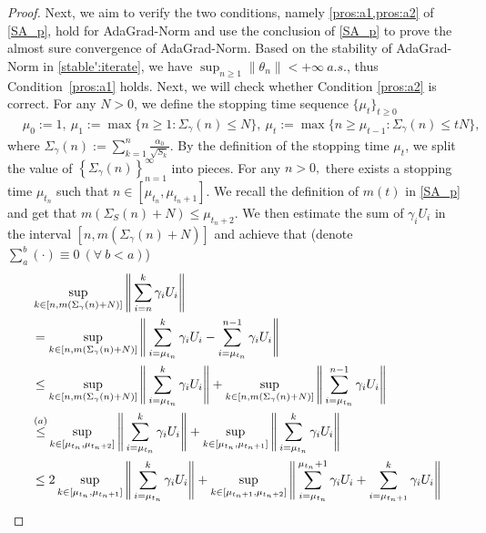 \documentclass[standalone]{article}
\begin{document}
\begin{proof}
Next, we aim to verify the two conditions, namely \cref{pros:a1,pros:a2} of \cref{SA_p}, hold for AdaGrad-Norm and use the conclusion of \cref{SA_p} to prove the almost sure convergence of AdaGrad-Norm.  Based on the stability of AdaGrad-Norm in \cref{stable':iterate}, we have \(\sup_{n\ge 1}\|\theta_{n}\|<+\infty\ a.s.\), thus Condition~\cref{pros:a1} holds. Next, we will check whether Condition \cref{pros:a2} is correct. For any \(N>0\), we define the stopping time sequence \(\{\mu_{t}\}_{t\ge 0}\)
\begin{equation}\nonumber\begin{aligned}
&\mu_{0}:=1,\ \mu_{1}:=\max\{n\ge 1:\Sigma_{\gamma}(n)\le N\},\ \mu_{t}:=\max\{n\ge \mu_{t-1}:\Sigma_{\gamma}(n)\le tN\},
\end{aligned}\end{equation}
where $ \Sigma_{\gamma}(n):=\sum_{k=1}^{n}\frac{\alpha_{0}}{\sqrt{S_{k}}}.$ By the definition of the stopping time $\mu_{t}$, we split the value of $\left\lbrace\Sigma_{\gamma}(n) \right\rbrace_{n=1}^{\infty}$ into pieces. 
For any $n>0,$ there exists a stopping time $\mu_{t_{n}}$ such that  $n\in[\mu_{t_{n}},\mu_{t_{n}+1}].$ We recall the definition of $m(t)$ in \cref{SA_p} and get that $m(\Sigma_{S}(n) + N) \leq \mu_{t_n+2}$. We then estimate the sum of $\gamma_{i}U_{i}$ in the interval $[n,m(\Sigma_{\gamma}(n)+N)]$ and achieve that (denote $\sum_{a}^{b}(\cdot)\equiv0\ (\forall\  b  < a)$)
\begin{align}\label{wxm_19}
 &\sup_{k\in[n,m(\Sigma_{\gamma}(n)+N)]}\Bigg\|\sum_{i=n}^{k}\gamma_{i}U_{i}\Bigg\| \notag\\
& =\sup_{k\in [n,m(\Sigma_{\gamma}(n)+N)]}\Bigg\|\sum_{i=\mu_{t_{n}}}^{k}\gamma_{i}U_{i}-\sum_{i=\mu_{t_{n}}}^{n-1}\gamma_{i}U_{i}\Bigg\|\notag\\&\le \sup_{k\in[n,m(\Sigma_{\gamma}(n)+N)]}\Bigg\|\sum_{i=\mu_{t_{n}}}^{k}\gamma_{i}U_{i}\Bigg\|+\sup_{k\in[n,m(\Sigma_{\gamma}(n)+N)]}\Bigg\|\sum_{i=\mu_{t_{n}}}^{n-1}\gamma_{i}U_{i}\Bigg\|\notag\\&\mathop{\le}^{(a)}\sup_{k\in[\mu_{t_{n}}, \mu_{t_{n}+2}]}\Bigg\|\sum_{i=\mu_{t_{n}}}^{k}\gamma_{i}U_{i}\Bigg\|+\sup_{k\in[\mu_{t_{n}}, \mu_{t_{n}+1}]}\Bigg\|\sum_{i=\mu_{t_{n}}}^{k}\gamma_{i}U_{i}\Bigg\|\notag\\&\le 2\sup_{k\in[\mu_{t_{n}}, \mu_{t_{n}+1}]}\Bigg\|\sum_{i=\mu_{t_{n}}}^{k}\gamma_{i}U_{i}\Bigg\| + \sup_{k\in[\mu_{t_{n}+1}, \mu_{t_{n}+2}]}\Bigg\|\sum_{i=\mu_{t_{n}}}^{\mu_{t_n}+1}\gamma_{i}U_{i} + \sum_{i=\mu_{t_{n}+1}}^{k}\gamma_{i}U_{i}\Bigg\| \notag \\

\end{align}
\end{proof}
\end{document}
